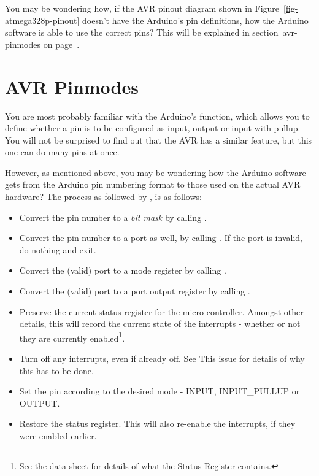 You may be wondering how, if the AVR pinout diagram shown in Figure~\ref{fig-atmega328p-pinout} doesn't have the Arduino's pin definitions, how the Arduino software is able to use the correct pins? This will be explained in section~\refname{avr-pinmodes} on page~\pageref{avr-pinmodes}.

\section{AVR Pinmodes}\label{avr-pinmodes}

You are most probably familiar with the Arduino's  function, which allows you to define whether a pin is to be configured as input, output or input with pullup. You will not be surprised to find out that the AVR has a similar feature, but this one can do many pins at once.

However, as mentioned above, you may be wondering how the  Arduino software gets from the Arduino pin numbering format to those used on the actual AVR hardware? The process  as followed by , is as follows:

\begin{itemize}
	\item Convert the pin number to a \emph{bit mask} by calling .
	\item Convert the pin number to a port as well, by calling . If the port is invalid, do nothing and exit.
	\item Convert the (valid) port to a mode register by calling .
	\item Convert the (valid) port to a port output register by calling .
	\item Preserve the current status register for the micro controller. Amongst other details, this will record the current state of the interrupts - whether or not they are currently enabled\footnote{See the data sheet for details of what the Status Register contains.}.
	\item Turn off any interrupts, even if already off. See \href{http://code.google.com/p/arduino/issues/detail?id=146}{This issue} for details of why this has to be done.
	\item Set the pin according to the desired mode - INPUT, INPUT\_PULLUP or OUTPUT.
	\item Restore the status register. This will also re-enable the interrupts, if they were enabled earlier.
\end{itemize}

